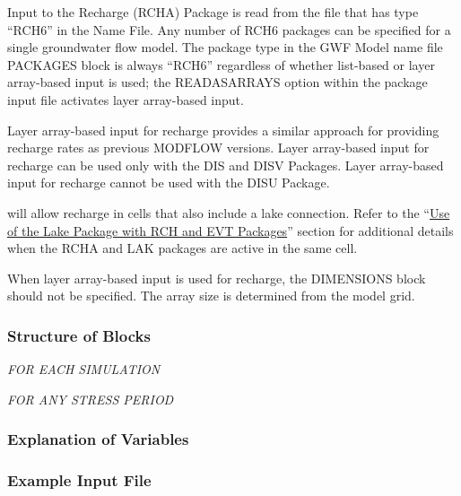 
Input to the Recharge (RCHA) Package is read from the file that has type ``RCH6'' in the Name File.  Any number of RCH6 packages can be specified for a single groundwater flow model.  The package type in the GWF Model name file PACKAGES block is always ``RCH6'' regardless of whether list-based or layer array-based input is used; the READASARRAYS option within the package input file activates layer array-based input.

Layer array-based input for recharge provides a similar approach for providing recharge rates as previous MODFLOW versions.  Layer array-based input for recharge can be used only with the DIS and DISV Packages.  Layer array-based input for recharge cannot be used with the DISU Package.

\mf will allow recharge in cells that also include a lake connection.  Refer to the ``\hyperref[sec:lakrchet]{Use of the Lake Package with RCH and EVT Packages}'' section for additional details when the RCHA and LAK packages are active in the same cell.

When layer array-based input is used for recharge, the DIMENSIONS block should not be specified.  The array size is determined from the model grid. 

\vspace{5mm}
\subsubsection{Structure of Blocks}
\vspace{5mm}

\noindent \textit{FOR EACH SIMULATION}

\vspace{5mm}
\noindent \textit{FOR ANY STRESS PERIOD}


\vspace{5mm}
\subsubsection{Explanation of Variables}
\begin{description}

\end{description}

\vspace{5mm}
\subsubsection{Example Input File}


